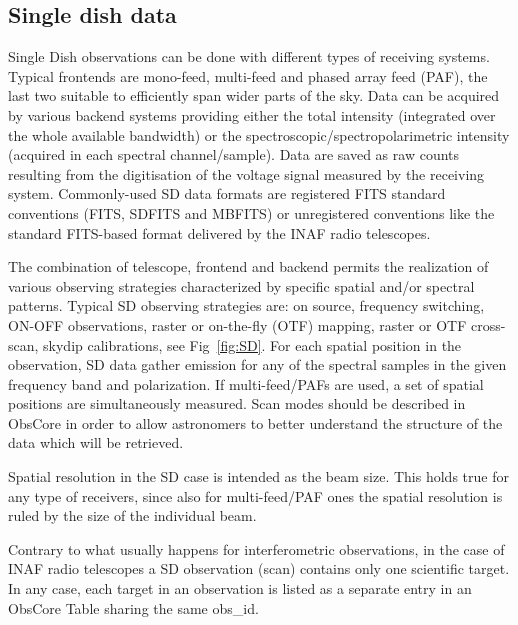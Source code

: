 \documentclass[11pt,a4paper]{ivoa}
\begin{document}
\subsection{Single dish data}\label{subsec:sd}

Single Dish observations can be done with different types of receiving systems. Typical frontends are mono-feed, multi-feed and phased array feed (PAF), the last two suitable to efficiently span wider parts of the sky. 
Data can be acquired by various backend systems providing either the total intensity (integrated over the whole available bandwidth) or the spectroscopic/spectropolarimetric intensity (acquired in each spectral channel/sample).
Data are saved as raw counts resulting from the digitisation of the voltage signal measured by the receiving system.
Commonly-used SD data formats are registered FITS standard conventions (FITS, SDFITS and MBFITS) or unregistered conventions like the standard FITS-based format delivered by the INAF radio telescopes.

The combination of telescope, frontend and backend permits the realization of various observing strategies characterized by specific spatial and/or spectral patterns.
Typical SD observing strategies are: on source, frequency switching, ON-OFF observations, raster or on-the-fly (OTF) mapping, raster or OTF cross-scan, skydip calibrations, see Fig~\ref{fig:SD}. For each spatial position in the observation, SD data gather emission for any of the spectral samples in the given frequency band and polarization.  
If multi-feed/PAFs are used, a set of spatial positions are simultaneously measured. Scan modes should be described in ObsCore in order to allow astronomers to better understand the structure of the data which will be retrieved.

Spatial resolution in the SD case is intended as the beam size. This holds true for any type of receivers, since also for multi-feed/PAF ones the spatial resolution is ruled by the size of the individual beam. 

Contrary to what usually happens for  interferometric observations, in the case of INAF radio telescopes a SD observation (scan) contains only one scientific target. In any case, each target in an observation is listed as a separate entry in an ObsCore Table sharing the same obs\_id.
\end{document}

